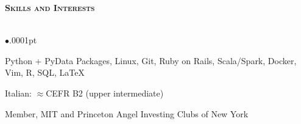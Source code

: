 \documentclass[11pt]{article}
\newcommand{\lineunder}{\vspace*{-8pt} \\ \hspace*{-18pt} \hrulefill \\}
\newcommand{\header}[1]{{\hspace*{-15pt}\vspace*{5pt} \Large \textsc{\textbf{#1}}} \vspace*{-6pt} \lineunder \vspace*{0pt} }
\newcommand{\employer}[4]{
	{\hspace*{-20pt} {\small{\textbf{\textsc{ #1}}}}
  \hfill \small{\emph{#2}}\\ ~\hspace*{-20pt} \small \emph{ #3 \hfill #4}}\\ }
\newenvironment{achievements}{\begin{list}{$\bullet$}{\topsep .0001pt \itemsep -2pt}}{\vspace*{5pt}\end{list} }
\begin{document}




\header{Skills and Interests}
	\vspace{-2pt}
	\begin{achievements}
		\item Python + PyData Packages, Linux, Git, Ruby on Rails, Scala/Spark, Docker, Vim, R, SQL, \LaTeX{}
		\item Italian: $\approx$CEFR B2 (upper intermediate)
		\item Member, MIT and Princeton Angel Investing Clubs of New York
	\end{achievements}
\end{document}
